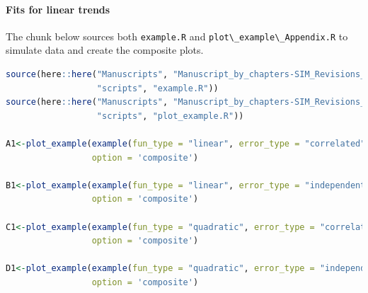 \documentclass[
]{article}
\newcommand{\passthrough}[1]{#1}
\begin{document}
\hypertarget{fits-for-linear-trends}{%
\paragraph{Fits for linear trends}\label{fits-for-linear-trends}}

The chunk below sources both \passthrough{\lstinline!example.R!} and \passthrough{\lstinline!plot\_example\_Appendix.R!} to simulate data and create the composite plots.

\begin{lstlisting}[language=R]
source(here::here("Manuscripts", "Manuscript_by_chapters-SIM_Revisions_final", 
                  "scripts", "example.R"))
source(here::here("Manuscripts", "Manuscript_by_chapters-SIM_Revisions_final", 
                  "scripts", "plot_example.R"))

A1<-plot_example(example(fun_type = "linear", error_type = "correlated"),
                 option = 'composite') 

B1<-plot_example(example(fun_type = "linear", error_type = "independent"),
                 option = 'composite') 

C1<-plot_example(example(fun_type = "quadratic", error_type = "correlated"), 
                 option = 'composite') 

D1<-plot_example(example(fun_type = "quadratic", error_type = "independent"), 
                 option = 'composite') 
\end{lstlisting}
\end{document}
